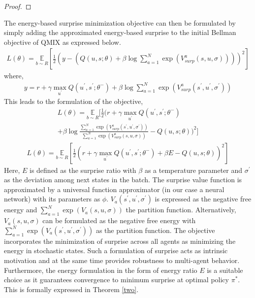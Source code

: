 \documentclass{article}
\begin{document}
\begin{multicols}{2}
\begin{proof}
  \end{proof}  
The energy-based surprise minimization objective can then be formulated by simply adding the approximated energy-based surprise to the initial Bellman objective \cite{rl} of QMIX as expressed below.
\begin{gather}
  L(\theta) = \underset{b \sim R}{\mathbb{E}}[\frac{1}{2}(y - (Q(u,s;\theta) + \beta \log \sum_{a=1}^{N} \exp{(V^{a}_{surp}(s,u,\sigma))}))^{2}] \nonumber
\end{gather}
where,
\begin{gather}
  y = r + \gamma \underset{u^{'}}{\max}Q(u^{'},s^{'};\theta^{-}) + \beta \log \sum_{a=1}^{N} \exp{(V^{a}_{surp}(s^{'},u^{'},\sigma^{'}))}
\end{gather}
This leads to the formulation of the objective,
\begin{multline}
    L(\theta )= \underset{b \sim R}{\mathbb{E}}[\frac{1}{2}(r + \gamma \underset{u^{'}}{\max}Q(u^{'},s^{'};\theta^{-})\\ + \beta \log \frac{\sum_{a=1}^{N} \exp{(V^{a}_{surp}(s^{'},u^{'},\sigma^{'}))}}{\sum_{a=1}^{N} \exp{(V^{a}_{surp}(s,u,\sigma))}} - Q(u,s;\theta))^{2}]
\end{multline}
\begin{gather}
  L(\theta) = \underset{b \sim R}{\mathbb{E}}[\frac{1}{2}(r + \gamma \underset{u^{'}}{\max}Q(u^{'},s^{'};\theta^{-}) + \beta E - Q(u,s;\theta))^{2}] \label{eq:3}
\end{gather}
Here, $E$ is defined as the surprise ratio with $\beta$ as a temperature parameter and $\sigma^{'}$ as the deviation among next states in the batch. The surprise value function is approximated by a universal function approximator (in our case a neural network) with its parameters as $\phi$. $V_{a}(s^{'},u^{'},\sigma^{'})$ is expressed as the negative free energy and $\sum_{a=1}^{N} \exp{(V_{a}(s,u,\sigma))}$ the partition function. Alternatively, $V_{a}(s,u,\sigma)$ can be formulated as the negative free energy with $\sum_{a=1}^{N} \exp{(V_{a}(s^{'},u^{'},\sigma^{'}))}$ as the partition function. The objective incorporates the minimization of surprise across all agents as minimizing the energy in stochastic states. Such a formulation of surprise acts as intrinsic motivation \cite{curiosity} and at the same time provides robustness to multi-agent behavior. Furthermore, the energy formulation in the form of energy ratio $E$ is a suitable choice as it guarantees convergence to minimum surprise at optimal policy $\pi^{*}$. This is formally expressed in Theorem \autoref{two}.

\end{multicols}
\end{document}
